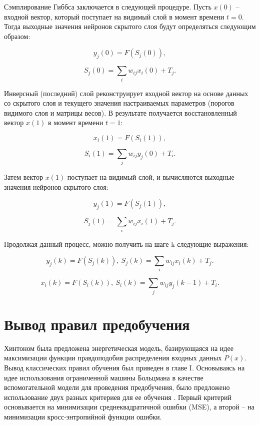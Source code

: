 Сэмплирование Гиббса заключается в следующей процедуре. Пусть $x(0)$ -- входной вектор, который поступает на видимый слой в момент времени $t=0$. Тогда выходные значения нейронов скрытого слоя будут определяться следующим образом:

\begin{equation}
    y_j(0)=F(S_j(0)),
\end{equation}

\begin{equation}
    S_j(0)=\sum_i w_{ij}x_i(0)+T_j.
\end{equation}

Инверсный (последний) слой  реконструирует входной вектор на основе данных со скрытого слоя и текущего значения настраиваемых параметров (порогов видимого слоя и матрицы весов). В результате получается восстановленный вектор $x(1)$ в момент времени $t=1$:

\begin{equation}
    x_i(1)=F(S_i(1)),
\end{equation}

\begin{equation}
    S_i(1)=\sum_j w_{ij}y_j(0)+T_i.
\end{equation}

Затем вектор $x(1)$ поступает на видимый слой, и вычисляются выходные значения нейронов скрытого слоя: 

\begin{equation}
    y_j(1)=F(S_j(1)),
\end{equation}

\begin{equation}
    S_j(1)=\sum_i w_{ij}x_i(1)+T_j.
\end{equation}

Продолжая данный процесс, можно получить на шаге k следующие выражения:

\begin{equation*}		
    y_j(k)=F(S_j(k)),\ S_j(k)=\sum_i w_{ij}x_i(k)+T_j.
\end{equation*}

\begin{equation*}		
    x_i(k)=F(S_i(k)),\ S_i(k)=\sum_j w_{ij}y_j(k-1)+T_i.
\end{equation*}

\section{Вывод правил предобучения} 

Хинтоном была предложена энергетическая модель, базирующаяся на идее максимизации функции правдоподобия распределения входных данных $P(x)$. Вывод классических правил обучения был приведен в главе I. Основываясь на идее использования ограниченной машины Больцмана в качестве вспомогательной модели для проведения предобучения, было предложено использование двух разных критериев для ее обучения \cite{4-A}. Первый критерий основывается на минимизации среднеквадратичной ошибки (MSE), а второй -- на минимизации кросс-энтропийной функции ошибки.


